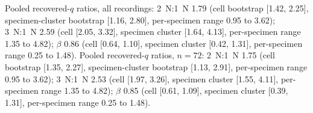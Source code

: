 Pooled recovered-$q$ ratios, all recordings: \SI{2}{\newton}:\SI{1}{\newton} 1.79 (cell bootstrap [1.42, 2.25], specimen-cluster bootstrap [1.16, 2.80], per-specimen range 0.95 to 3.62); \SI{3}{\newton}:\SI{1}{\newton} 2.59 (cell [2.05, 3.32], specimen cluster [1.64, 4.13], per-specimen range 1.35 to 4.82); $\beta$ 0.86 (cell [0.64, 1.10], specimen cluster [0.42, 1.31], per-specimen range 0.25 to 1.48). Pooled recovered-$q$ ratios, $n = 72$: \SI{2}{\newton}:\SI{1}{\newton} 1.75 (cell bootstrap [1.35, 2.27], specimen-cluster bootstrap [1.13, 2.91], per-specimen range 0.95 to 3.62); \SI{3}{\newton}:\SI{1}{\newton} 2.53 (cell [1.97, 3.26], specimen cluster [1.55, 4.11], per-specimen range 1.35 to 4.82); $\beta$ 0.85 (cell [0.61, 1.09], specimen cluster [0.39, 1.31], per-specimen range 0.25 to 1.48).
